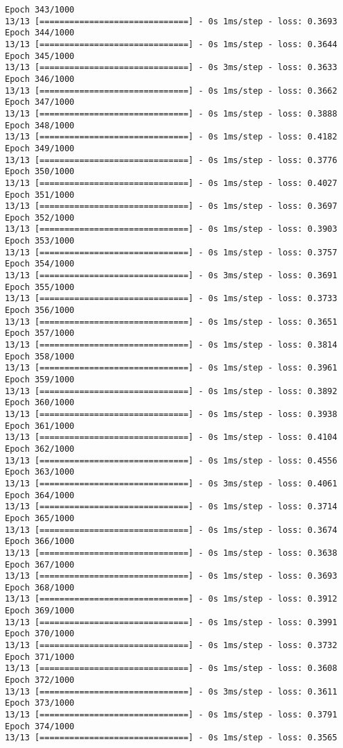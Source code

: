 \documentclass[11pt]{article}
\begin{document}
\begin{Verbatim}[commandchars=\\\{\}]
Epoch 343/1000
13/13 [==============================] - 0s 1ms/step - loss: 0.3693
Epoch 344/1000
13/13 [==============================] - 0s 1ms/step - loss: 0.3644
Epoch 345/1000
13/13 [==============================] - 0s 3ms/step - loss: 0.3633
Epoch 346/1000
13/13 [==============================] - 0s 1ms/step - loss: 0.3662
Epoch 347/1000
13/13 [==============================] - 0s 1ms/step - loss: 0.3888
Epoch 348/1000
13/13 [==============================] - 0s 1ms/step - loss: 0.4182
Epoch 349/1000
13/13 [==============================] - 0s 1ms/step - loss: 0.3776
Epoch 350/1000
13/13 [==============================] - 0s 1ms/step - loss: 0.4027
Epoch 351/1000
13/13 [==============================] - 0s 1ms/step - loss: 0.3697
Epoch 352/1000
13/13 [==============================] - 0s 1ms/step - loss: 0.3903
Epoch 353/1000
13/13 [==============================] - 0s 1ms/step - loss: 0.3757
Epoch 354/1000
13/13 [==============================] - 0s 3ms/step - loss: 0.3691
Epoch 355/1000
13/13 [==============================] - 0s 1ms/step - loss: 0.3733
Epoch 356/1000
13/13 [==============================] - 0s 1ms/step - loss: 0.3651
Epoch 357/1000
13/13 [==============================] - 0s 1ms/step - loss: 0.3814
Epoch 358/1000
13/13 [==============================] - 0s 1ms/step - loss: 0.3961
Epoch 359/1000
13/13 [==============================] - 0s 1ms/step - loss: 0.3892
Epoch 360/1000
13/13 [==============================] - 0s 1ms/step - loss: 0.3938
Epoch 361/1000
13/13 [==============================] - 0s 1ms/step - loss: 0.4104
Epoch 362/1000
13/13 [==============================] - 0s 1ms/step - loss: 0.4556
Epoch 363/1000
13/13 [==============================] - 0s 3ms/step - loss: 0.4061
Epoch 364/1000
13/13 [==============================] - 0s 1ms/step - loss: 0.3714
Epoch 365/1000
13/13 [==============================] - 0s 1ms/step - loss: 0.3674
Epoch 366/1000
13/13 [==============================] - 0s 1ms/step - loss: 0.3638
Epoch 367/1000
13/13 [==============================] - 0s 1ms/step - loss: 0.3693
Epoch 368/1000
13/13 [==============================] - 0s 1ms/step - loss: 0.3912
Epoch 369/1000
13/13 [==============================] - 0s 1ms/step - loss: 0.3991
Epoch 370/1000
13/13 [==============================] - 0s 1ms/step - loss: 0.3732
Epoch 371/1000
13/13 [==============================] - 0s 1ms/step - loss: 0.3608
Epoch 372/1000
13/13 [==============================] - 0s 3ms/step - loss: 0.3611
Epoch 373/1000
13/13 [==============================] - 0s 1ms/step - loss: 0.3791
Epoch 374/1000
13/13 [==============================] - 0s 1ms/step - loss: 0.3565

\end{Verbatim}
\end{document}
